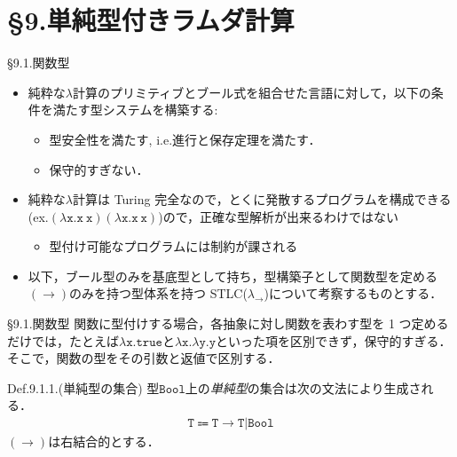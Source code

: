 \documentclass[9pt]{beamer}
\begin{document}
\section{\S9.単純型付きラムダ計算}
\begin{frame}{\S9.1.関数型}
\begin{itemize}
\item 純粋な$\lambda$計算のプリミティブとブール式を組合せた言語に対して，以下の条件を満たす型システムを構築する:\begin{itemize}
\item 型安全性を満たす, i.e.進行と保存定理を満たす．
\item 保守的すぎない．
\end{itemize}
\item 純粋な$\lambda$計算は Turing 完全なので，とくに発散するプログラムを構成できる(ex.$\mathtt{(\lambda x. x\ x)(\lambda x. x\ x)}$)ので，正確な型解析が出来るわけではない
\begin{itemize}
\item 型付け可能なプログラムには制約が課される
\end{itemize}
\item 以下，ブール型のみを基底型として持ち，型構築子として関数型を定める$(\rightarrow)$のみを持つ型体系を持つ STLC($\lambda_{\rightarrow}$)について考察するものとする．
\end{itemize}
\end{frame}
\begin{frame}{\S9.1.関数型}
関数に型付けする場合，各抽象に対し関数を表わす型を 1 つ定めるだけでは，たとえば$\mathtt{\lambda x. true}$と$\mathtt{\lambda x. \lambda y.y}$といった項を区別できず，保守的すぎる．そこで，関数の型をその引数と返値で区別する．
\begin{dblock}{Def.9.1.1.(単純型の集合)}
型$\mathtt{Bool}$上の\emph{単純型}の集合は次の文法により生成される．
\begin{align*}
\mathtt{T}\Coloneq\mathtt{T\rightarrow T}|\mathtt{Bool}
\end{align*}
$(\rightarrow)$は右結合的とする．
\end{dblock}
\end{frame}
\end{document}

